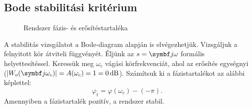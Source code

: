 \subsection{Bode stabilitási kritérium}

\begin{figure}[htb]
  \centering
  \hspace{-4cm}
  
  \caption{Rendszer {\color{darkRed} fázis}- és {\color{darkYellow} erősítés}tartaléka}
  \label{fig:Bode-PM}
\end{figure}

A stabilitás vizsgálatot a Bode-diagram alapján is elvégezhetjük. Vizsgáljuk
a felnyitott kör átviteli függvényét. Éljünk az $s = \iu \omega$ formális
helyettesítéssel. Keressük meg $\omega_c$ vágási körfrekvenciát, ahol az
erősítés egységnyi ($\abs{W_o(\iu \omega_c)} = A(\omega_c) = 1 = 0 \,
  \mathrm{dB}$). Számítsuk ki a fázistartalékot az alábbi képlettel:
\begin{equation}
  \varphi_t = \varphi(\omega_c) - (- \pi)
  .
  \label{eq:Bode-PM}
\end{equation}
Amennyiben a fázistartalék pozitív, a rendszer stabil.
